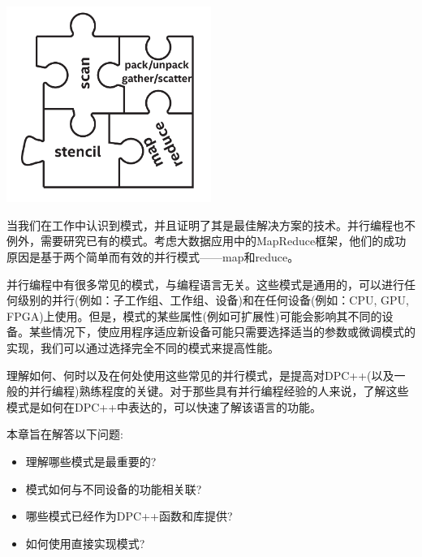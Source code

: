 \begin{center}
	\includegraphics[width=0.5\textwidth]{content/chapter-14/images/1}
\end{center}

当我们在工作中认识到模式，并且证明了其是最佳解决方案的技术。并行编程也不例外，需要研究已有的模式。考虑大数据应用中的MapReduce框架，他们的成功原因是基于两个简单而有效的并行模式——map和reduce。\par

并行编程中有很多常见的模式，与编程语言无关。这些模式是通用的，可以进行任何级别的并行(例如：子工作组、工作组、设备)和在任何设备(例如：CPU, GPU, FPGA)上使用。但是，模式的某些属性(例如可扩展性)可能会影响其不同的设备。某些情况下，使应用程序适应新设备可能只需要选择适当的参数或微调模式的实现，我们可以通过选择完全不同的模式来提高性能。\par

理解如何、何时以及在何处使用这些常见的并行模式，是提高对DPC++(以及一般的并行编程)熟练程度的关键。对于那些具有并行编程经验的人来说，了解这些模式是如何在DPC++中表达的，可以快速了解该语言的功能。\par

本章旨在解答以下问题:\par

\begin{itemize}
	\item 理解哪些模式是最重要的?
	\item 模式如何与不同设备的功能相关联?
	\item 哪些模式已经作为DPC++函数和库提供?
	\item 如何使用直接实现模式?
\end{itemize}











